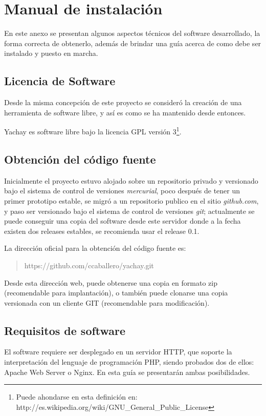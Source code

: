 \chapter{Manual de instalación}
En este anexo se presentan algunos aspectos técnicos del software desarrollado,
la forma correcta de obtenerlo, además de brindar una guía acerca de como debe
ser instalado y puesto en marcha.

\section{Licencia de Software}
Desde la misma concepción de este proyecto se consideró la creación de una
herramienta de software libre, y así es como se ha mantenido desde entonces.

Yachay es software libre bajo la licencia GPL versión 3\footnote{Puede ahondarse
en esta definición en:
http://es.wikipedia.org/wiki/GNU\_General\_Public\_License}.

\section{Obtención del código fuente}
Inicialmente el proyecto estuvo alojado sobre un repositorio privado y
versionado bajo el sistema de control de versiones \emph{mercurial}, poco
después de tener un primer prototipo estable, se migró a un repositorio
publico en el sitio \emph{github.com}, y paso ser versionado bajo el sistema de
control de versiones \emph{git}; actualmente se puede conseguir una copia del
software desde este servidor donde a la fecha existen dos releases estables, se
recomienda usar el release 0.1.

La dirección oficial para la obtención del código fuente es:
\begin{quote}
https://github.com/ccaballero/yachay.git
\end{quote}

Desde esta dirección web, puede obtenerse una copia en formato zip
(recomendable para implantación), o también puede clonarse una copia versionada
con un cliente GIT (recomendable para modificación).

\section{Requisitos de software}
El software requiere ser desplegado en un servidor HTTP, que soporte la
interpretación del lenguaje de programación PHP, siendo probados dos de
ellos: Apache Web Server o Nginx. En esta guía se presentarán ambas
posibilidades.

